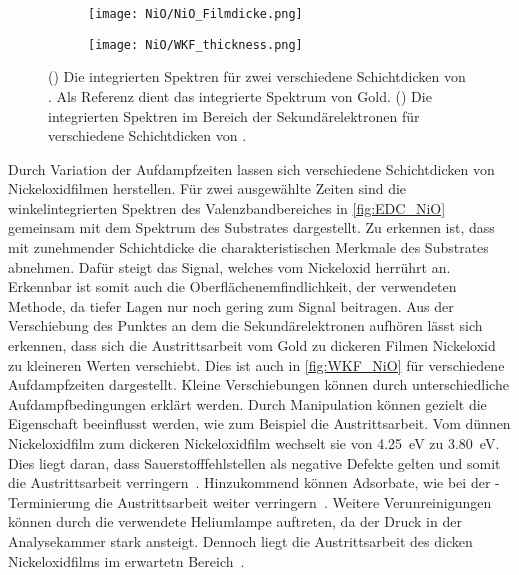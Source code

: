         \begin{figure}
            \centering
            \begin{subfigure}[t]{0.48\textwidth}
                \centering
                \texttt{[image: NiO/NiO\_Filmdicke.png]}
                \subcaption{}
                \label{fig:EDC_NiO}
            \end{subfigure}
            \begin{subfigure}[t]{0.48\textwidth}
                \centering
                \texttt{[image: NiO/WKF\_thickness.png]}
                \caption{}
                \label{fig:WKF_NiO}
            \end{subfigure}
            \caption{() Die integrierten Spektren für zwei verschiedene Schichtdicken von . Als Referenz dient das integrierte Spektrum von Gold. 
            () Die integrierten Spektren im Bereich der Sekundärelektronen für verschiedene Schichtdicken von .}
        \end{figure}
        Durch Variation der Aufdampfzeiten lassen sich verschiedene Schichtdicken von Nickeloxidfilmen herstellen.
        Für zwei ausgewählte Zeiten sind die winkelintegrierten Spektren des Valenzbandbereiches in \autoref{fig:EDC_NiO} gemeinsam mit dem Spektrum des Substrates dargestellt.
        Zu erkennen ist, dass mit zunehmender Schichtdicke die charakteristischen Merkmale des Substrates abnehmen.
        Dafür steigt das Signal, welches vom Nickeloxid herrührt an.
        Erkennbar ist somit auch die Oberflächenemfindlichkeit, der verwendeten Methode, da tiefer Lagen nur noch gering zum Signal beitragen.
        Aus der Verschiebung des Punktes an dem die Sekundärelektronen aufhören lässt sich erkennen, dass sich die Austrittsarbeit vom Gold zu dickeren Filmen Nickeloxid zu kleineren Werten verschiebt.
        Dies ist auch in \autoref{fig:WKF_NiO} für verschiedene Aufdampfzeiten dargestellt. 
        Kleine Verschiebungen können durch unterschiedliche Aufdampfbedingungen erklärt werden.
        Durch Manipulation können gezielt die Eigenschaft beeinflusst werden, wie zum Beispiel die Austrittsarbeit.
        Vom dünnen Nickeloxidfilm zum dickeren Nickeloxidfilm wechselt sie von \SI{4.25}{\electronvolt} zu \SI{3.80}{\electronvolt}.
        Dies liegt daran, dass Sauerstofffehlstellen als negative Defekte gelten und somit die Austrittsarbeit verringern~\cite{IF_3}.
        Hinzukommend können Adsorbate, wie bei der -Terminierung die Austrittsarbeit weiter verringern~\cite{NiO_40}.
        Weitere Verunreinigungen können durch die verwendete Heliumlampe auftreten, da der Druck in der Analysekammer stark ansteigt.
        Dennoch liegt die Austrittsarbeit des dicken Nickeloxidfilms im erwartetn Bereich~\cite{poulain_electronic_2020}.

